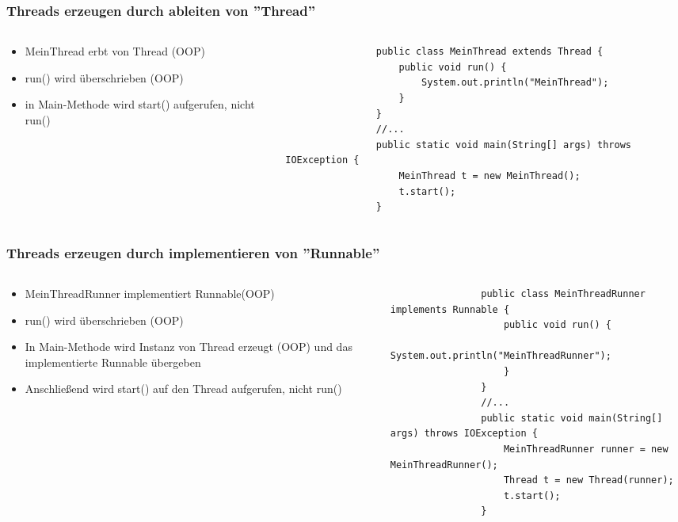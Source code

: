 \begin{frame}[fragile]
	\frametitle{Threads erzeugen durch ableiten von ''Thread''}
	\begin{columns}
		\begin{column}{0.5\textwidth}
			\small
			\begin{itemize}
			  \item MeinThread erbt von Thread (OOP)
			  \item run() wird überschrieben (OOP)
			  \item in Main-Methode wird start() aufgerufen, nicht run()
			\end{itemize}
			\normalsize
		\end{column}
		\begin{column}{0.5\textwidth}
			\begin{lstlisting}
				public class MeinThread extends Thread {
					public void run() {
						System.out.println("MeinThread");
					}
				}
				//...
				public static void main(String[] args) throws IOException {
					MeinThread t = new MeinThread();
					t.start();
				}
			\end{lstlisting}
		\end{column}
	\end{columns}
\end{frame}


\begin{frame}[fragile]
	\frametitle{Threads erzeugen durch implementieren von ''Runnable''}
	\begin{columns}
		\begin{column}{0.5\textwidth}
			\small
			\begin{itemize}
			  \item MeinThreadRunner implementiert Runnable(OOP)
			  \item run() wird überschrieben (OOP)
			  \item In Main-Methode wird Instanz von Thread erzeugt (OOP) und das
			  implementierte Runnable übergeben
			  \item Anschließend wird start() auf den Thread aufgerufen, nicht run()
			\end{itemize}
			\normalsize
		\end{column}
		\begin{column}{0.5\textwidth}
			\begin{lstlisting}
				public class MeinThreadRunner implements Runnable {
					public void run() {
						System.out.println("MeinThreadRunner");
					}
				}				
				//...
				public static void main(String[] args) throws IOException {
					MeinThreadRunner runner = new MeinThreadRunner();
					Thread t = new Thread(runner);
					t.start();
				}
			\end{lstlisting}
		\end{column}
	\end{columns}
\end{frame}

